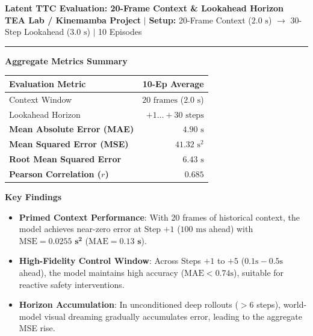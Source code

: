 \documentclass[10pt,letterpaper]{article}
\begin{document}
\begin{center}
    {\Large \textbf{\textcolor{teaNavy}{Latent TTC Evaluation: 20-Frame Context \& Lookahead Horizon}}}\\[0.2em]
    \small \textbf{TEA Lab / Kinemamba Project} \quad $\vert$ \quad \textbf{Setup:} 20-Frame Context ($2.0\text{ s}$) $\to$ 30-Step Lookahead ($3.0\text{ s}$) $\vert$ 10 Episodes
\end{center}
\vspace{-0.6em}
\textcolor{lineGray}{\rule{\textwidth}{0.8pt}}
\vspace{0.35em}

\noindent
\begin{minipage}[t]{0.45\textwidth}
    \textbf{\textcolor{teaNavy}{\normalsize Aggregate Metrics Summary}}
    \vspace{0.2em}
    
    \footnotesize
    \begin{tabularx}{\linewidth}{X r}
        \toprule
        \textbf{Evaluation Metric} & \textbf{10-Ep Average} \\
        \midrule
        Context Window & $20\text{ frames}$ ($2.0\text{ s}$) \\
        Lookahead Horizon & $+1 \dots +30\text{ steps}$ \\
        \textbf{Mean Absolute Error (MAE)} & \textbf{$4.90\text{ s}$} \\
        \textbf{Mean Squared Error (MSE)} & \textbf{$41.32\text{ s}^2$} \\
        \textbf{Root Mean Squared Error} & \textbf{$6.43\text{ s}$} \\
        \textbf{Pearson Correlation ($r$)} & \textbf{$0.685$} \\
        \bottomrule
    \end{tabularx}
\end{minipage}
\hfill
\begin{minipage}[t]{0.53\textwidth}
    \textbf{\textcolor{teaNavy}{\normalsize Key Findings}}
    \vspace{0.2em}
    
    \small
    \begin{itemize}\setlength{\itemsep}{0.25em}\setlength{\leftskip}{-1.2em}
        \item \textbf{Primed Context Performance}: With 20 frames of historical context, the model achieves near-zero error at Step $+1$ ($100\text{ ms}$ ahead) with $\text{MSE} = \mathbf{0.0255\text{ s}^2}$ ($\text{MAE} = \mathbf{0.13\text{ s}}$).
        \item \textbf{High-Fidelity Control Window}: Across Steps $+1$ to $+5$ ($0.1\text{s} - 0.5\text{s}$ ahead), the model maintains high accuracy ($\text{MAE} < 0.74\text{s}$), suitable for reactive safety interventions.
        \item \textbf{Horizon Accumulation}: In unconditioned deep rollouts ($> 6$ steps), world-model visual dreaming gradually accumulates error, leading to the aggregate MSE rise.
    \end{itemize}
\end{minipage}
\end{document}
